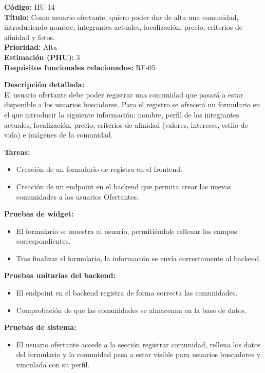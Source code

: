 \begin{tarjetaHU}
\textbf{Código:} HU-14 \\
\textbf{Título:} Como usuario ofertante, quiero poder dar de alta una comunidad, introduciendo nombre, integrantes actuales, localización, precio, criterios de afinidad y fotos. \\
\textbf{Prioridad:} Alta \\
\textbf{Estimación (PHU):} 3 \\
\textbf{Requisitos funcionales relacionados:} RF-05

\vspace{0.5em}
\textbf{Descripción detallada:} \\
El usuario ofertante debe poder registrar una comunidad que pasará a estar disponible a los usuarios buscadores. Para el registro se ofrecerá un formulario en el que introducir la siguiente información: nombre, perfil de los integrantes actuales, localización, precio, criterios de afinidad (valores, intereses, estilo de vida) e imágenes de la comunidad.

\vspace{0.5em}
\textbf{Tareas:}
\begin{itemize}[left=0pt]
  \item Creación de un formulario de registro en el frontend. 
  \item Creación de un endpoint en el backend que permita crear las nuevas comunidades a los usuarios Ofertantes.
\end{itemize}

\vspace{0.5em}
\textbf{Pruebas de widget:}
\begin{itemize}[left=0pt]
  \item El formulario se muestra al usuario, permitiéndole rellenar los campos correspondientes.
  \item Tras finalizar el formulario, la información se envía correctamente al backend.
\end{itemize}
\textbf{Pruebas unitarias del backend:}
\begin{itemize}[left=0pt]
  \item El endpoint en el backend registra de forma correcta las comunidades.
  \item Comprobación de que las comunidades se almacenan en la base de datos.
\end{itemize}
\textbf{Pruebas de sistema:}
\begin{itemize}[left=0pt]
    \item El usuario ofertante accede a la sección registrar comunidad, rellena los datos del formulario y la comunidad pasa a estar visible para usuarios buscadores y vinculada con su perfil.
\end{itemize}
\end{tarjetaHU}

